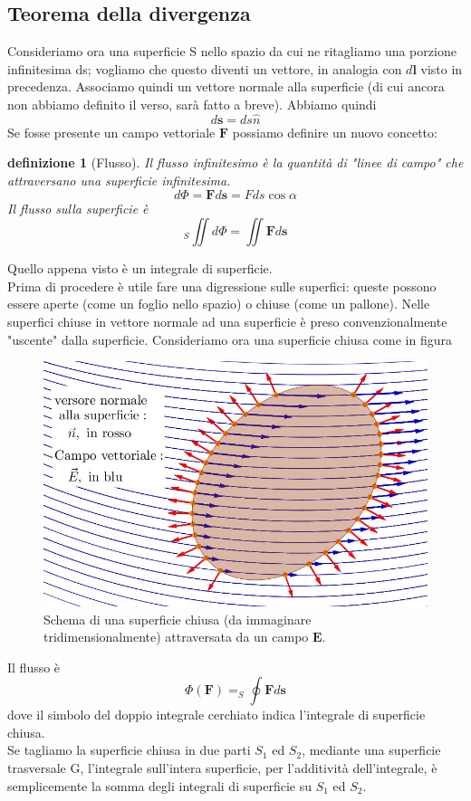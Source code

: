 \documentclass[10pt,a4paper]{article}
\newtheorem{definizione}{definizione}
\begin{document}
\subsection{Teorema della divergenza}\label{ap:thm_divergenza}
Consideriamo ora una superficie S nello spazio da cui ne ritagliamo una porzione infinitesima ds; vogliamo che questo diventi un vettore, in analogia con $d\mathbf{l}$ visto in precedenza. Associamo quindi un vettore normale alla superficie (di cui ancora non abbiamo definito il verso, sarà fatto a breve). Abbiamo quindi
\[d\mathbf{s} = ds \hat{n}\]
Se fosse presente un campo vettoriale $\mathbf{F}$ possiamo definire un nuovo concetto:
\begin{definizione}[Flusso]
	Il flusso infinitesimo è la quantità di "linee di campo" che attraversano una superficie infinitesima. 
	\[d\Phi = \mathbf{F}d\mathbf{s} = Fds\cos\alpha\]
	Il flusso sulla superficie è 
	\[_S\iint d\Phi = \iint \mathbf{F}d\mathbf{s}\]
\end{definizione}
Quello appena visto è un integrale di superficie.\\
Prima di procedere è utile fare una digressione sulle superfici: queste possono essere aperte (come un foglio nello spazio) o chiuse (come un pallone). Nelle superfici chiuse in vettore normale ad una superficie è preso convenzionalmente "uscente" dalla superficie. Consideriamo ora una superficie chiusa come in figura
\begin{figure}[h!]
	\centering
	\includegraphics[width=0.6\linewidth]{images/flusso2bis}
	\caption{Schema di una superficie chiusa (da immaginare tridimensionalmente) attraversata da un campo \(\mathbf{E}\).}
	\label{fig:flusso2bis}
\end{figure}
\FloatBarrier
Il flusso è 
\[\Phi(\mathbf{F}) = _S\oint \mathbf{F}d\mathbf{s}\]
dove il simbolo del doppio integrale cerchiato indica l'integrale di superficie chiusa.\\
Se tagliamo la superficie chiusa in due parti \(S_1\) ed \(S_2\), mediante una superficie trasversale G, l'integrale sull'intera superficie, per l'additività dell'integrale, è semplicemente la somma degli integrali di superficie su \(S_1\) ed \(S_2\).
\end{document}
